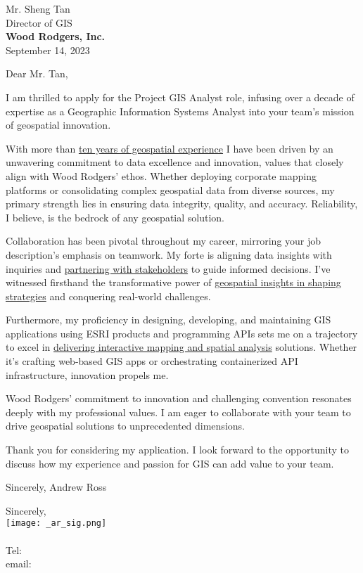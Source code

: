 \documentclass[letterpaper]{article}
\newcommand{\impt}[1]{\uline{#1}}
\begin{document}
\large
Mr. Sheng Tan \\
Director of GIS \\
\textbf{Wood Rodgers, Inc.} \\

\null\hfill September 14, 2023

Dear Mr. Tan,

I am thrilled to apply for the Project GIS Analyst role, infusing over a decade
of expertise as a Geographic Information Systems Analyst into your team's
mission of geospatial innovation.

With more than \impt{ten years of geospatial experience} I have been driven by an unwavering
commitment to data excellence and innovation, values that closely align with
Wood Rodgers' ethos. Whether deploying corporate mapping platforms or consolidating
complex geospatial data from diverse sources, my primary strength lies in
ensuring data integrity, quality, and accuracy. Reliability, I believe, is the
bedrock of any geospatial solution.

Collaboration has been pivotal throughout my career, mirroring your job
description's emphasis on teamwork. My forte is aligning data insights with
inquiries and \impt{partnering with stakeholders} to guide informed decisions. I've
witnessed firsthand the transformative power of \impt{geospatial insights in shaping
strategies} and conquering real-world challenges.

Furthermore, my proficiency in designing, developing, and maintaining GIS
applications using ESRI products and programming APIs
sets me on a trajectory to excel in \impt{delivering interactive mapping
and spatial analysis} solutions. Whether it's crafting web-based GIS apps or
orchestrating containerized API infrastructure, innovation propels me.

Wood Rodgers' commitment to innovation and challenging convention resonates
deeply with my professional values. I am eager to collaborate with your team to
drive geospatial solutions to unprecedented dimensions.

Thank you for considering my application. I look forward to the opportunity to
discuss how my experience and passion for GIS can add value to your team.

Sincerely,
Andrew Ross

Sincerely,\\
    \hspace{1em}
    \texttt{[image: \_ar\_sig.png]} \\
    \CVsigname \\
    \small
    Tel: \CVphone \\
    email: \CVemail
\end{document}
